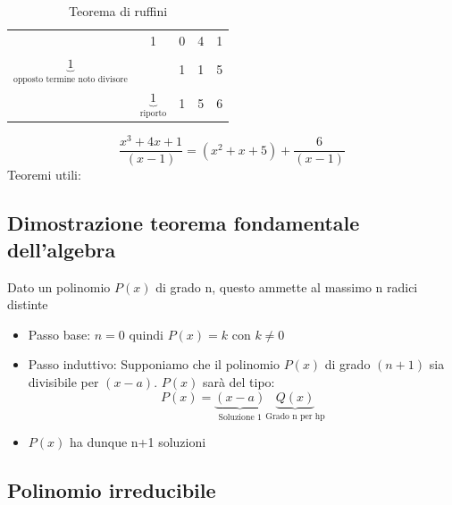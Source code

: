 \begin{table}[H]
	\centering
	\caption{Teorema di ruffini}
	\begin{tabular}{c|ccc|c}
		                                                          & 1                                   & 0 & 4 & 1 \\
		$ \underbrace{1}_{\text{opposto termine noto divisore}} $ &                                     & 1 & 1 & 5 \\
		\hline
		                                                          & $ \underbrace{1}_{\text{riporto}} $ & 1 & 5 & 6 \\
	\end{tabular}
\end{table}
\[
	\frac{x^3 + 4x + 1}{\left( x-1 \right)} = \left( x^2 + x + 5 \right) +\frac{6}{\left( x-1 \right)}
\]
Teoremi utili:

\subsection{Dimostrazione teorema fondamentale dell'algebra}
\label{sub:dimostrazioneperinduzione}
Dato un polinomio $P\left( x \right) $ di grado n, questo ammette al massimo n radici distinte
\begin{itemize}
	\item Passo base: $n=0$ quindi  $P\left( x \right) = k$ con $k \neq 0$
	\item Passo induttivo: Supponiamo che il polinomio $P\left( x \right) $ di grado $\left( n+1 \right)$ sia divisibile per $\left( x-a \right) $. $P\left( x \right)$ sarà del tipo: \[
		      P\left( x \right) = \underbrace{\left( x-a \right) }_{\text{Soluzione 1}}\underbrace{Q\left( x \right)}_{\text{Grado n per hp}}
	      \]
	\item $P\left( x \right) $ ha dunque n+1 soluzioni
\end{itemize}
\subsection{Polinomio irreducibile}

